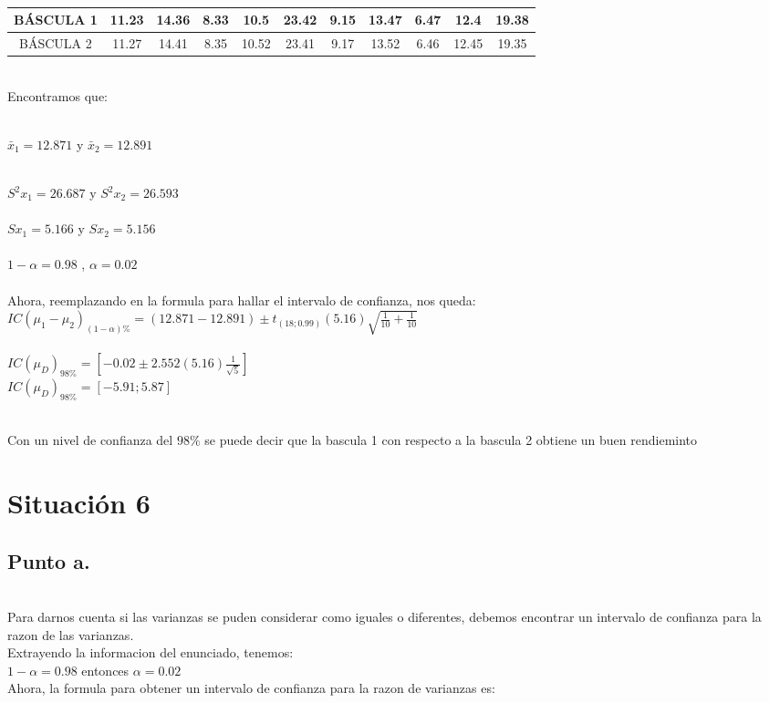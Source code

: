 \documentclass[letterpaper,12pt,onecolumn,titlepage]{article}
\begin{document}
~\\ \begin{center}
 \begin{tabular}{|c|c|c|c|c|c|c|c|c|c|c|}
\hline 
\rule[-1ex]{0pt}{2.5ex} B\'{A}SCULA 1 & 11.23 & 14.36 & 8.33 & 10.5 & 23.42 & 9.15 & 13.47 & 6.47 & 12.4 & 19.38 \\ 
\hline 
\rule[-1ex]{0pt}{2.5ex} B\'{A}SCULA 2 & 11.27 & 14.41 & 8.35 & 10.52 & 23.41 & 9.17 & 13.52 & 6.46 & 12.45 & 19.35 \\ 
\hline 

\end{tabular} 
\end{center}

~\\ Encontramos que: 

~\\$\bar{x}_{1}=12.871$ y $\bar{x}_{2}=12.891$

~\\$S^2{x}_{1}=26.687$ y $S^2{x}_{2}=26.593$\\
~\\$S{x}_{1}=5.166$ y $S{x}_{2}=5.156$\\
~\\ $1-\alpha=0.98$ ,  $\alpha= 0.02$\\

~\\ Ahora, reemplazando en la formula para hallar el intervalo de confianza, nos queda:
~\\ $IC(\mu_{1}-\mu_{2} )_{(1-\alpha)\%}=( 12.871 - 12.891) \pm t_{(18 ;0.99)}(5.16)\sqrt{\frac{1}{10}+\frac{1}{10}}$ \\
~\\ $IC(\mu_{D})_{98\%}=[-0.02 \pm 2.552 (5.16) \frac{1}{\sqrt{5}}]$
~\\ $IC(\mu_{D})_{98\%}=[-5.91 ; 5.87 ]$

~\\ Con un nivel de confianza del $98\%$ se puede decir que la bascula 1 con respecto a la bascula 2 obtiene un buen rendieminto 


\pagebreak\section{Situaci\'{o}n 6}
\subsection{Punto a.}
~\\ Para darnos cuenta si las varianzas se puden considerar como iguales o diferentes, debemos encontrar un intervalo de confianza para la razon de las varianzas.
~\\ Extrayendo la informacion del enunciado, tenemos:
~\\ $1-\alpha=0.98$ entonces $\alpha=0.02$
~\\ Ahora, la formula para obtener un intervalo de confianza para la razon de varianzas es:
\end{document}
